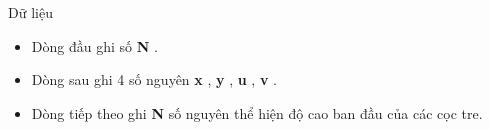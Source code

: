 Dữ liệu  
\begin{itemize}
	\item     Dòng đầu ghi số    \textbf{     N    }    .   
	\item     Dòng sau ghi 4 số nguyên    \textbf{     x    }    ,    \textbf{     y    }    ,    \textbf{     u    }    ,    \textbf{     v    }    .   
	\item     Dòng tiếp theo ghi    \textbf{     N    }    số nguyên thể hiện độ cao ban đầu của các cọc tre.   
\end{itemize}